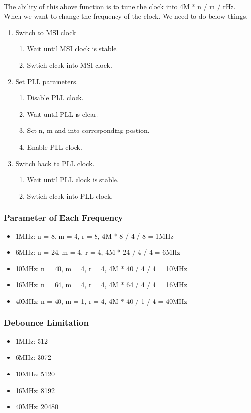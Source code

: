 \paragraph{}
The ability of this above function is to tune the clock into 4M * n / m / rHz. When we want to change the frequency of the clock. We need to do below things.
\begin{enumerate}
    \item Switch to MSI clock
    \begin{enumerate}
        \item Wait until MSI clock is stable.
        \item Swtich clcok into MSI clock.
    \end{enumerate}
    \item Set PLL parameters.
    \begin{enumerate}
        \item Disable PLL clock.
        \item Wait until PLL is clear.
        \item Set n, m and into corresponding postion.
        \item Enable PLL clock.
    \end{enumerate}
    \item Switch back to PLL clock.
    \begin{enumerate}
        \item Wait until PLL clock is stable.
        \item Swtich clcok into PLL clock.
    \end{enumerate}
\end{enumerate}
\subsubsection{Parameter of Each Frequency}
\begin{itemize}
    \item  1MHz: n =  8, m = 4, r = 8, 4M *  8 / 4 / 8 =  1MHz
    \item  6MHz: n = 24, m = 4, r = 4, 4M * 24 / 4 / 4 =  6MHz
    \item 10MHz: n = 40, m = 4, r = 4, 4M * 40 / 4 / 4 = 10MHz
    \item 16MHz: n = 64, m = 4, r = 4, 4M * 64 / 4 / 4 = 16MHz
    \item 40MHz: n = 40, m = 1, r = 4, 4M * 40 / 1 / 4 = 40MHz
\end{itemize}
\subsubsection{Debounce Limitation}
\begin{itemize}
    \item  1MHz: 512
    \item  6MHz: 3072
    \item 10MHz: 5120
    \item 16MHz: 8192
    \item 40MHz: 20480
\end{itemize}
